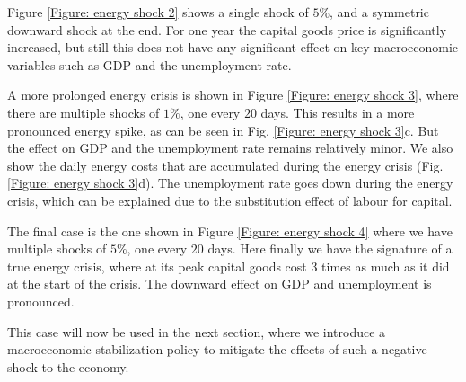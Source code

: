 Figure \ref{Figure: energy shock 2} shows a single shock of $5\%$, and a symmetric downward shock at the end.
For one year the capital goods price is significantly increased, but still this does not have any significant effect on key macroeconomic variables such as GDP and the unemployment rate.

A more prolonged energy crisis is shown in Figure \ref{Figure: energy shock 3}, where there are multiple shocks of $1\%$, one every $20$ days. This results in a more pronounced energy spike, as can be seen in Fig. \ref{Figure: energy shock 3}c. But the effect on GDP and the unemployment rate remains relatively minor. 
We also show the daily energy costs that are accumulated during the energy crisis (Fig. \ref{Figure: energy shock 3}d). The unemployment rate goes down during the energy crisis, which can be explained due to the substitution effect of labour for capital.

The final case is the one shown in Figure \ref{Figure: energy shock 4} where we have multiple shocks of $5\%$, one every $20$ days. Here finally we have the signature of a true energy crisis, where at its peak capital goods cost 3 times as much as it did at the start of the crisis. The downward effect on GDP and unemployment is pronounced.

This case will now be used in the next section, where we introduce a macroeconomic stabilization policy to mitigate the effects of such a negative shock to the economy.
